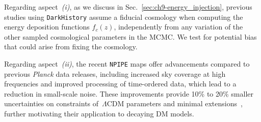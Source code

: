 Regarding aspect~\textit{(i)}, as we discuss in Sec.~\ref{sec:ch9-energy_injection}, previous studies using \texttt{DarkHistory} assume a fiducial cosmology when computing the energy deposition functions $f_c(z)$, independently from any variation of the other sampled cosmological parameters in the MCMC. We test for potential bias that could arise from fixing the cosmology.


Regarding aspect~\textit{(ii)}, the recent \texttt{NPIPE} maps offer advancements compared to previous \textit{Planck} data releases, including increased sky coverage at high frequencies and improved processing of time-ordered data, which lead to a reduction in small-scale noise.
These improvements provide 10\% to 20\% smaller uncertainties on constraints of~$\Lambda$CDM parameters and minimal extensions~\cite{Tristram:2023haj}, further motivating their application to decaying DM models.

